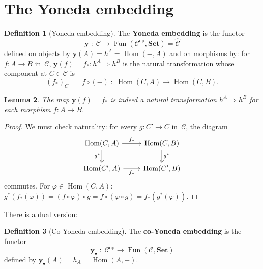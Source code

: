 \documentclass[a4paper,12pt]{book}
\DeclareMathOperator{\Hom}{Hom}
\DeclareMathOperator{\Fun}{Fun}
\newcommand{\Set}{\mathbf{Set}}
\newcommand{\op}{\mathrm{op}}
\theoremstyle{definition}
\newtheorem{definition}{Definition}[section]
\theoremstyle{plain}
\newtheorem{lemma}[definition]{Lemma}
\theoremstyle{remark}
\begin{document}
\section{The Yoneda embedding}\label{sec:yoneda-embedding}

\begin{definition}[Yoneda embedding]\label{def:yoneda-embedding}
The \textbf{Yoneda embedding} is the functor
\[
    \mathbf{y} \;\colon\; \mathcal{C} \longrightarrow
    \Fun(\mathcal{C}^{\op},\Set) = \widehat{\mathcal{C}}
\]
defined on objects by $\mathbf{y}(A) = h^A = \Hom(-,A)$
and on morphisms by: for $f\colon A\to B$ in~$\mathcal{C}$,
$\mathbf{y}(f) = f_*\colon h^A\Rightarrow h^B$ is the natural transformation
whose component at $C\in\mathcal{C}$ is
\[
    (f_*)_C \;=\; f\circ(-) \;\colon\;
    \Hom(C,A) \longrightarrow \Hom(C,B).
\]
\end{definition}

\begin{lemma}\label{lem:yoneda-well-defined}
The map $\mathbf{y}(f) = f_*$ is indeed a natural transformation
$h^A\Rightarrow h^B$ for each morphism $f\colon A\to B$.
\end{lemma}

\begin{proof}
We must check naturality: for every $g\colon C'\to C$ in~$\mathcal{C}$,
the diagram
\[
\begin{tikzcd}
\Hom(C,A) \arrow[r, "f_*"] \arrow[d, "g^*"'] &
\Hom(C,B) \arrow[d, "g^*"] \\
\Hom(C',A) \arrow[r, "f_*"'] &
\Hom(C',B)
\end{tikzcd}
\]
commutes.  For $\varphi\in\Hom(C,A)$:
$g^*(f_*(\varphi)) = (f\circ\varphi)\circ g = f\circ(\varphi\circ g)
= f_*(g^*(\varphi))$.
\end{proof}

There is a dual version:

\begin{definition}[Co-Yoneda embedding]\label{def:co-yoneda-embedding}
The \textbf{co-Yoneda embedding} is the functor
\[
    \mathbf{y}_{\bullet} \;\colon\; \mathcal{C}^{\op}
    \longrightarrow \Fun(\mathcal{C},\Set)
\]
defined by $\mathbf{y}_{\bullet}(A) = h_A = \Hom(A,-)$.
\end{definition}
\end{document}
